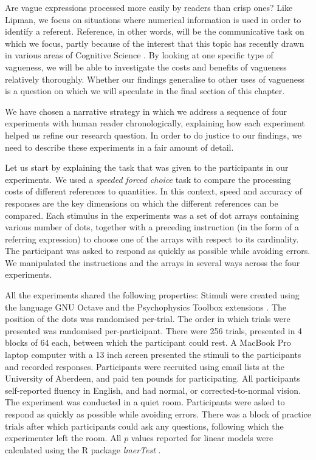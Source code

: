 Are vague expressions processed more easily by readers than crisp ones? Like Lipman, we focus on situations where numerical information is used in order to identify a referent. Reference, in other words, will be the communicative task on which we focus, partly because of the interest that this topic has recently drawn in various areas of Cognitive Science \citep{vanDeemterCMR}. By looking at one specific type of vagueness, we will be able to investigate the costs and benefits of vagueness relatively thoroughly. Whether our findings generalise to other uses of vagueness is a question on which we will speculate in the final section of this chapter.

We have chosen a narrative strategy in which we address a sequence of four experiments with human reader chronologically, explaining how each experiment helped us refine our research question. In order to do justice to our findings, we need to describe these experiments in a fair amount of detail. 

Let us start by explaining the task that was given to the participants in our experiments. We used a {\em speeded forced choice} task to compare the processing costs of different references to quantities. In this context, speed and accuracy of responses are the key dimensions on which the different references can be compared. Each stimulus in the experiments was a set of dot arrays containing various number of dots, together with a preceding instruction (in the form of a referring expression) to choose one of the arrays with respect to its cardinality. The participant was asked to respond as quickly as possible while avoiding errors. We manipulated the instructions and the arrays in several ways across the four experiments. 

All the experiments shared the following properties: Stimuli were created using the language GNU Octave \citep{eaton:2002} and the Psychophysics Toolbox extensions \citep{ptbx1, ptbx2}. The position of the dots was randomised per-trial. The order in which trials were presented was randomised per-participant. There were 256 trials, presented in 4 blocks of 64 each, between which the participant could rest. A MacBook Pro laptop computer with a 13 inch screen presented the stimuli to the participants and recorded responses. Participants were recruited using email lists at the University of Aberdeen, and paid ten pounds for participating. All participants self-reported fluency in English, and had normal, or corrected-to-normal vision. The experiment was conducted in a quiet room. Participants were asked to respond as quickly as possible while avoiding errors. There was a block of practice trials after which participants could ask any questions, following which the experimenter left the room. All $p$ values reported for linear models were calculated using the R package \emph{lmerTest} \citep{lmerTest}. 
 
